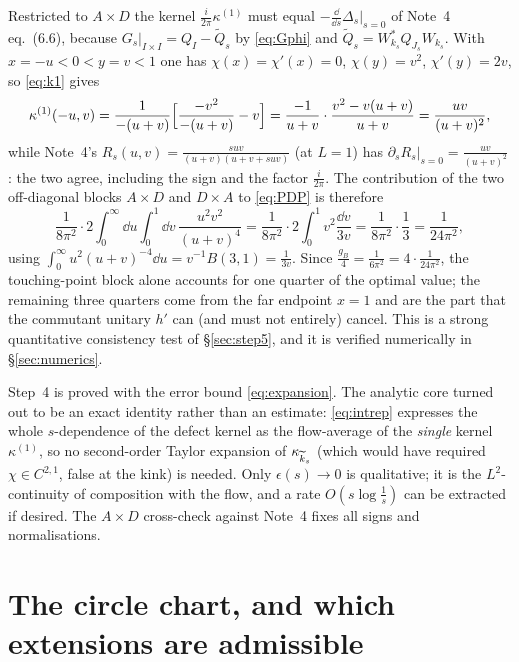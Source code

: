 \documentclass[11pt]{article}
\begin{document}
\begin{remark}\label{rem:crosscheck}
Restricted to $A\times D$ the kernel $\frac i{2\pi}\kappa^{(1)}$ must equal
$-\frac{\dd}{\dd s}\Delta_s\big|_{s=0}$ of Note~4 eq.~(6.6), because
$G_s|_{I\times I}=Q_I-\widetilde Q_s$ by \eqref{eq:Gphi} and $\widetilde Q_s=W_{k_s}^*Q_{J_s}W_{k_s}$.
With $x=-u<0<y=v<1$ one has $\chi(x)=\chi'(x)=0$, $\chi(y)=v^2$, $\chi'(y)=2v$, so \eqref{eq:k1} gives
\[
 \kappa^{(1)}(-u,v)=\frac1{-(u+v)}\Bigl[\frac{-v^2}{-(u+v)}-v\Bigr]
 =\frac{-1}{u+v}\cdot\frac{v^2-v(u+v)}{u+v}=\frac{uv}{(u+v)^2},
\]
while Note~4's $R_s(u,v)=\frac{suv}{(u+v)(u+v+suv)}$ (at $L=1$) has
$\partial_sR_s|_{s=0}=\frac{uv}{(u+v)^2}$: the two agree, including the sign and the factor
$\frac i{2\pi}$.  The contribution of the two off-diagonal blocks $A\times D$ and $D\times A$ to
\eqref{eq:PDP} is therefore
\begin{equation}\label{eq:AD-block}
 \frac1{8\pi^2}\cdot2\int_0^\infty\!\!\dd u\int_0^1\!\!\dd v\,\frac{u^2v^2}{(u+v)^4}
 =\frac1{8\pi^2}\cdot2\int_0^1 v^2\frac{\dd v}{3v}=\frac1{8\pi^2}\cdot\frac13=\frac1{24\pi^2},
\end{equation}
using $\int_0^\infty u^2(u+v)^{-4}\dd u=v^{-1}B(3,1)=\frac1{3v}$.  Since
$\frac{g_B}4=\frac1{6\pi^2}=4\cdot\frac1{24\pi^2}$, the touching-point block alone accounts for one
quarter of the optimal value; the remaining three quarters come from the far endpoint $x=1$ and are
the part that the commutant unitary $h'$ can (and must not entirely) cancel.  This is a strong
quantitative consistency test of \S\ref{sec:step5}, and it is verified numerically in
\S\ref{sec:numerics}.
\end{remark}

\begin{verdictok}
Step~4 is proved with the error bound \eqref{eq:expansion}.  The analytic core turned out to be an
exact identity rather than an estimate: \eqref{eq:intrep} expresses the whole $s$-dependence of the
defect kernel as the flow-average of the \emph{single} kernel $\kappa^{(1)}$, so no second-order
Taylor expansion of $\kappa_{\widetilde k_s}$ (which would have required $\chi\in C^{2,1}$, false at the kink)
is needed.  Only $\epsilon(s)\to0$ is qualitative; it is the $L^2$-continuity of composition with the
flow, and a rate $O(s\log\frac1s)$ can be extracted if desired.  The $A\times D$ cross-check against
Note~4 fixes all signs and normalisations.
\end{verdictok}

\section{The circle chart, and which extensions are admissible}\label{sec:circle}
\end{document}
